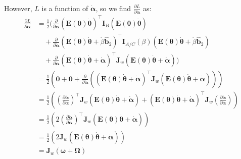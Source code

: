 \documentclass[titlepage]{article}
\begin{document}
However, $L$ is a function of $\dot{\boldsymbol{\alpha}}$, so we find $\frac{\partial L}{\partial\dot{\boldsymbol{\alpha}}}$ as:
\begin{equation}
	\begin{split}
		\frac{\partial L}{\partial\dot{\boldsymbol{\alpha}}}&=\frac{1}{2}\bigg(\frac{\partial}{\partial\dot{\boldsymbol{\alpha}}}\left(\boldsymbol{E}(\boldsymbol{\theta})\dot{\boldsymbol{\theta}}\right)^\top\boldsymbol{I}_B\left(\boldsymbol{E}(\boldsymbol{\theta})\dot{\boldsymbol{\theta}}\right) \\
		&\quad+\frac{\partial}{\partial\dot{\boldsymbol{\alpha}}}\left(\boldsymbol{E}(\boldsymbol{\theta})\dot{\boldsymbol{\theta}}+\dot{\beta}\hat{\boldsymbol{b}}_2\right)^\top\boldsymbol{I}_{A/C}(\beta)\left(\boldsymbol{E}(\boldsymbol{\theta})\dot{\boldsymbol{\theta}}+\dot{\beta}\hat{\boldsymbol{b}}_2\right) \\
		&\quad+\frac{\partial}{\partial\dot{\boldsymbol{\alpha}}}\left(\boldsymbol{E}(\boldsymbol{\theta})\dot{\boldsymbol{\theta}}+\dot{\boldsymbol{\alpha}}\right)^\top\boldsymbol{J}_w\left(\boldsymbol{E}(\boldsymbol{\theta})\dot{\boldsymbol{\theta}}+\dot{\boldsymbol{\alpha}}\right)\bigg) \\
		&=\frac{1}{2}\left(\boldsymbol{0}+\boldsymbol{0}+\frac{\partial}{\partial\dot{\boldsymbol{\alpha}}}\left(\left(\boldsymbol{E}(\boldsymbol{\theta})\dot{\boldsymbol{\theta}}+\dot{\boldsymbol{\alpha}}\right)^\top\boldsymbol{J}_w\left(\boldsymbol{E}(\boldsymbol{\theta})\dot{\boldsymbol{\theta}}+\dot{\boldsymbol{\alpha}}\right)\right)\right) \\
		&=\frac{1}{2}\left(\left(\frac{\partial\dot{\boldsymbol{\alpha}}}{\partial\dot{\boldsymbol{\alpha}}}\right)^\top\boldsymbol{J}_w\left(\boldsymbol{E}(\boldsymbol{\theta})\dot{\boldsymbol{\theta}}+\dot{\boldsymbol{\alpha}}\right)+\left(\boldsymbol{E}(\boldsymbol{\theta})\dot{\boldsymbol{\theta}}+\dot{\boldsymbol{\alpha}}\right)^\top\boldsymbol{J}_w\left(\frac{\partial\dot{\boldsymbol{\alpha}}}{\partial\dot{\boldsymbol{\alpha}}}\right)\right) \\
		&=\frac{1}{2}\left(2\left(\frac{\partial\dot{\boldsymbol{\alpha}}}{\partial\dot{\boldsymbol{\alpha}}}\right)^\top\boldsymbol{J}_w\left(\boldsymbol{E}(\boldsymbol{\theta})\dot{\boldsymbol{\theta}}+\dot{\boldsymbol{\alpha}}\right)\right) \\
		&=\frac{1}{2}\left(2\boldsymbol{J}_w\left(\boldsymbol{E}(\boldsymbol{\theta})\dot{\boldsymbol{\theta}}+\dot{\boldsymbol{\alpha}}\right)\right) \\
		&=\boldsymbol{J}_w\left(\boldsymbol{\omega}+\boldsymbol{\Omega}\right)
	\end{split}
	\label{eq:alphadotterm}
\end{equation}
\end{document}
